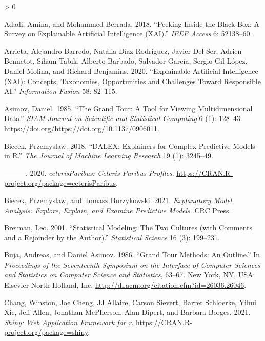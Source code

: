 \documentclass[
]{article}
\newlength{\cslhangindent}
\newenvironment{CSLReferences}[2] %
 {%
  \setlength{\parindent}{0pt}
  \ifodd #1 \everypar{\setlength{\hangindent}{\cslhangindent}}\ignorespaces\fi
  \ifnum #2 > 0
  \setlength{\parskip}{#2\baselineskip}
  \fi
 }%
 {}
\begin{document}
\hypertarget{refs}{}
\begin{CSLReferences}{1}{0}
\leavevmode\hypertarget{ref-adadi_peeking_2018}{}%
Adadi, Amina, and Mohammed Berrada. 2018. {``Peeking Inside the Black-Box: A Survey on Explainable Artificial Intelligence ({XAI}).''} \emph{IEEE Access} 6: 52138--60.

\leavevmode\hypertarget{ref-arrieta_explainable_2020}{}%
Arrieta, Alejandro Barredo, Natalia Díaz-Rodríguez, Javier Del Ser, Adrien Bennetot, Siham Tabik, Alberto Barbado, Salvador García, Sergio Gil-López, Daniel Molina, and Richard Benjamins. 2020. {``Explainable {Artificial} {Intelligence} ({XAI}): {Concepts}, Taxonomies, Opportunities and Challenges Toward Responsible {AI}.''} \emph{Information Fusion} 58: 82--115.

\leavevmode\hypertarget{ref-asimov_grand_1985}{}%
Asimov, Daniel. 1985. {``The {Grand} {Tour}: A {Tool} for {Viewing} {Multidimensional} {Data}.''} \emph{SIAM Journal on Scientific and Statistical Computing} 6 (1): 128--43. https://doi.org/\url{https://doi.org/10.1137/0906011}.

\leavevmode\hypertarget{ref-biecek_dalex_2018}{}%
Biecek, Przemyslaw. 2018. {``{DALEX}: Explainers for Complex Predictive Models in {R}.''} \emph{The Journal of Machine Learning Research} 19 (1): 3245--49.

\leavevmode\hypertarget{ref-biecek_ceterisparibus_2020}{}%
---------. 2020. \emph{{ceterisParibus}: {Ceteris} {Paribus} {Profiles}}. \url{https://CRAN.R-project.org/package=ceterisParibus}.

\leavevmode\hypertarget{ref-biecek_explanatory_2021}{}%
Biecek, Przemyslaw, and Tomasz Burzykowski. 2021. \emph{Explanatory {Model} {Analysis}: {Explore}, {Explain}, and {Examine} {Predictive} {Models}}. CRC Press.

\leavevmode\hypertarget{ref-breiman_statistical_2001}{}%
Breiman, Leo. 2001. {``Statistical Modeling: {The} Two Cultures (with Comments and a Rejoinder by the Author).''} \emph{Statistical Science} 16 (3): 199--231.

\leavevmode\hypertarget{ref-buja_grand_1986}{}%
Buja, Andreas, and Daniel Asimov. 1986. {``Grand {Tour} {Methods}: {An} {Outline}.''} In \emph{Proceedings of the {Seventeenth} {Symposium} on the {Interface} of {Computer} {Sciences} and {Statistics} on {Computer} {Science} and {Statistics}}, 63--67. New York, NY, USA: Elsevier North-Holland, Inc. \url{http://dl.acm.org/citation.cfm?id=26036.26046}.

\leavevmode\hypertarget{ref-chang_shiny_2021}{}%
Chang, Winston, Joe Cheng, JJ Allaire, Carson Sievert, Barret Schloerke, Yihui Xie, Jeff Allen, Jonathan McPherson, Alan Dipert, and Barbara Borges. 2021. \emph{Shiny: Web Application Framework for r}. \url{https://CRAN.R-project.org/package=shiny}.


\end{CSLReferences}
\end{document}
